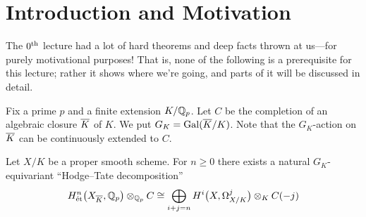 \chapter{Introduction and Motivation}
\renewcommand{\thedummy}{\thechapter.\thesection.\arabic{dummy}}
The $0^{\text{th}}$ lecture had a lot of hard theorems and deep facts thrown at us---for purely motivational purposes! That is, none of the following is a prerequisite for this lecture; rather it shows where we're going, and parts of it will be discussed in detail.

Fix a prime $p$ and a finite extension $K/\mathbb{Q}_p$. Let $C$ be the completion of an algebraic closure $\ov{K}$ of $K$. We put $G_K=\Gal(\ov{K}/K)$. Note that the $G_K$-action on $\ov{K}$ can be continuously extended to $C$.
\begin{thm}\label{thm:HTdecomp}
	Let $X/K$ be a proper smooth scheme. For $n\geq 0$ there exists a natural $G_K$-equivariant \enquote{Hodge--Tate decomposition}
	\begin{equation*}
		H_\et^n\big(X_{\ov{K}},\IQ_p\big)\otimes_{\IQ_p}C\cong \bigoplus_{i+j=n}H^i\big(X,\Omega_{X/K}^j\big)\otimes_KC(-j)
	\end{equation*}
\end{thm}
